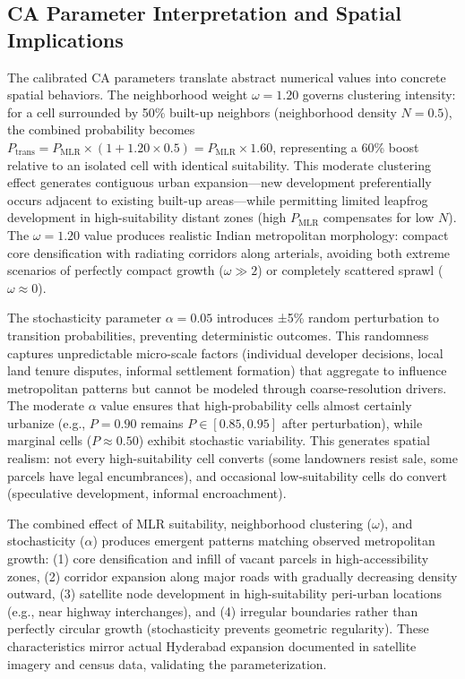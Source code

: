 \documentclass[conference]{IEEEtran}
\begin{document}
\subsection{CA Parameter Interpretation and Spatial Implications}

The calibrated CA parameters translate abstract numerical values into concrete spatial behaviors. The neighborhood weight $\omega=1.20$ governs clustering intensity: for a cell surrounded by 50\% built-up neighbors (neighborhood density $N=0.5$), the combined probability becomes $P_{\text{trans}} = P_{\text{MLR}} \times (1 + 1.20 \times 0.5) = P_{\text{MLR}} \times 1.60$, representing a 60\% boost relative to an isolated cell with identical suitability. This moderate clustering effect generates contiguous urban expansion—new development preferentially occurs adjacent to existing built-up areas—while permitting limited leapfrog development in high-suitability distant zones (high $P_{\text{MLR}}$ compensates for low $N$). The $\omega=1.20$ value produces realistic Indian metropolitan morphology: compact core densification with radiating corridors along arterials, avoiding both extreme scenarios of perfectly compact growth ($\omega \gg 2$) or completely scattered sprawl ($\omega \approx 0$).

The stochasticity parameter $\alpha=0.05$ introduces ±5\% random perturbation to transition probabilities, preventing deterministic outcomes. This randomness captures unpredictable micro-scale factors (individual developer decisions, local land tenure disputes, informal settlement formation) that aggregate to influence metropolitan patterns but cannot be modeled through coarse-resolution drivers. The moderate $\alpha$ value ensures that high-probability cells almost certainly urbanize (e.g., $P=0.90$ remains $P \in [0.85, 0.95]$ after perturbation), while marginal cells ($P \approx 0.50$) exhibit stochastic variability. This generates spatial realism: not every high-suitability cell converts (some landowners resist sale, some parcels have legal encumbrances), and occasional low-suitability cells do convert (speculative development, informal encroachment).

The combined effect of MLR suitability, neighborhood clustering ($\omega$), and stochasticity ($\alpha$) produces emergent patterns matching observed metropolitan growth: (1) core densification and infill of vacant parcels in high-accessibility zones, (2) corridor expansion along major roads with gradually decreasing density outward, (3) satellite node development in high-suitability peri-urban locations (e.g., near highway interchanges), and (4) irregular boundaries rather than perfectly circular growth (stochasticity prevents geometric regularity). These characteristics mirror actual Hyderabad expansion documented in satellite imagery and census data, validating the parameterization.
\end{document}
